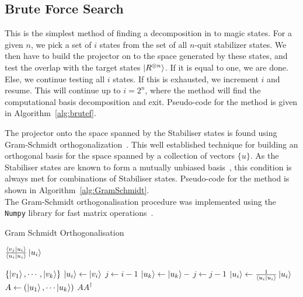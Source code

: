 \documentclass{standalone}
\begin{document}
\subsection{Brute Force Search}
This is the simplest method of finding a decomposition in to magic states. For a given $n$, we pick a set of $i$ states from the set of all $n$-quit stabilizer states. We then have to build the projector on to the space generated by these states, and test the overlap with the target states $\ket{R^{\otimes n}}$. If it is equal to one, we are done. Else, we continue testing all $i$ states. If this is exhausted, we increment $i$ and resume. This will continue up to $i=2^{n}$, where the method will find the computational basis decomposition and exit. Pseudo-code for the method is given in Algorithm~\ref{alg:brutef}.
\par
The projector onto the space spanned by the Stabiliser states is found using Gram-Schmidt orthogonalization~\cite{Nielsen2000}. This well established technique for building an orthogonal basis for the space spanned by a collection of vectors $\{u\}$. As the Stabiliser states are known to form a mutually unbiased basis~\cite{Howard2013}, this condition is always met for combinations of Stabiliser states. Pseudo-code for the method is shown in Algorithm~\ref{alg:GramSchmidt}.\\
The Gram-Schmidt orthogonalisation procedure was implemented using the \texttt{Numpy} library for fast matrix operations~\cite{VanderWalt2011}.  
\begin{algorithm}
\caption{Gram Schmidt Orthogonalisation}
\label{alg:GramSchmidt}
\begin{algorithmic}
    \State \Return $\frac{\braket{v_{j}}{u_{i}}}{\braket{u_{i}}{u_{i}}}\ket{u_{i}}$
\EndFunction
\end{algorithmic}
\begin{algorithmic}[1]
\Require $\{\ket{v_{1}},\cdots,\ket{v_{k}}\}$ 
    \State $\ket{u_{i}}\leftarrow\ket{v_{i}}$
    \State $j\leftarrow i-1$
        \State $\ket{u_{k}} \leftarrow \ket{u_{k}} -$ 
        \State $j\leftarrow j-1$
    \EndWhile
    \State $\ket{u_{i}}\leftarrow \frac{1}{\braket{u_{i}}{u_{i}}}\ket{u_{i}}$ 
\EndFor
\State $A\leftarrow \left(\ket{u_{1}},\cdots\ket{u_{k}}\right)$ 
\State \Return $AA^{\dagger}$ 
\end{algorithmic}
\end{algorithm}
\end{document}
